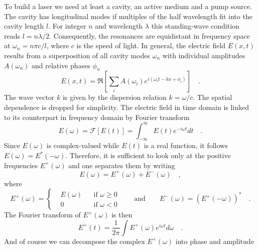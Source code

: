 To build a laser we need at least a cavity, an active medium and a pump source. The cavity has longitudinal modes if multiples of the half wavelength fit into the cavity length $l$. For integer $n$ and wavelength $\lambda$ this standing-wave condition reads ${l = n\lambda/2}$. Consequently, the resonances are equidistant in frequency space at $\omega_{n} = n\pi c/l$, where $c$ is the speed of light.  
In general, the electric field $E(x,t)$ results from a superposition of all cavity modes $\omega_{n}$ with individual amplitudes $A(\omega_{n})$ and relative phases $\phi_{n}$
\begin{equation}
	E(x,t) = \Re \left[ \sum_{i} A(\omega_{i}) e^{i (\omega_{i} t - k x + \phi_{i})} \right] \quad .
\end{equation}
The wave vector $k$ is given by the dispersion relation $k=\omega/c$.
The spatial dependence is dropped for simplicity. The electric field in time domain is linked to its counterpart in frequency domain by Fourier transform
\begin{equation}
	E(\omega) = \mathcal{F}[E(t)] = \int_{-\infty}^{\infty} E(t) e^{- i \omega t} dt \quad .
\end{equation}
Since $E(\omega)$ is complex-valued while $E(t)$ is a real function, it follows $E(\omega) = E^{*}(-\omega)$. Therefore, it is sufficient to look only at the positive frequencies $E^{+}(\omega)$ and  one separates them by writing
\begin{equation}
	E(\omega) = E^{+}(\omega) + E^{-}(\omega) \quad ,
\end{equation}
where
\begin{equation}
	E^{+}(\omega) = \left \{ 
	\begin{aligned}
		& E(\omega) &&\text{if } \omega \geq 0 \\
		& 0 && \text{if } \omega < 0
	\end{aligned} \right.
	\qquad \text{and} \qquad
	E^{-}(\omega) = (E^{+}(-\omega))^{*} \quad .
\end{equation}
The Fourier transform of $E^{+}(\omega)$ is then
\begin{equation}
	E^{+}(t) = \frac{1}{2\pi} \int E^{+}(\omega) e^{ i \omega t} d\omega \quad .
\end{equation}
And of course we can decompose the complex $E^{+}(\omega)$  into phase and amplitude

